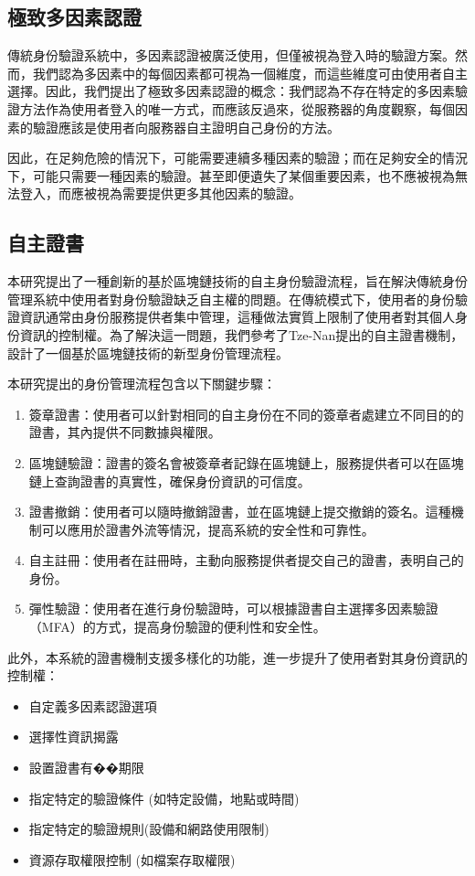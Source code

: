 \subsection{極致多因素認證}
傳統身份驗證系統中，多因素認證被廣泛使用，但僅被視為登入時的驗證方案。然而，我們認為多因素中的每個因素都可視為一個維度，而這些維度可由使用者自主選擇。因此，我們提出了極致多因素認證的概念：我們認為不存在特定的多因素驗證方法作為使用者登入的唯一方式，而應該反過來，從服務器的角度觀察，每個因素的驗證應該是使用者向服務器自主證明自己身份的方法。

因此，在足夠危險的情況下，可能需要連續多種因素的驗證；而在足夠安全的情況下，可能只需要一種因素的驗證。甚至即便遺失了某個重要因素，也不應被視為無法登入，而應被視為需要提供更多其他因素的驗證。
\subsection{自主證書}
本研究提出了一種創新的基於區塊鏈技術的自主身份驗證流程，旨在解決傳統身份管理系統中使用者對身份驗證缺乏自主權的問題。在傳統模式下，使用者的身份驗證資訊通常由身份服務提供者集中管理，這種做法實質上限制了使用者對其個人身份資訊的控制權。為了解決這一問題，我們參考了Tze-Nan\cite{NTU202102846}提出的自主證書機制，設計了一個基於區塊鏈技術的新型身份管理流程。

本研究提出的身份管理流程包含以下關鍵步驟：
\begin{enumerate}
  \item 簽章證書：使用者可以針對相同的自主身份在不同的簽章者處建立不同目的的證書，其內提供不同數據與權限。
  \item 區塊鏈驗證：證書的簽名會被簽章者記錄在區塊鏈上，服務提供者可以在區塊鏈上查詢證書的真實性，確保身份資訊的可信度。
  \item 證書撤銷：使用者可以隨時撤銷證書，並在區塊鏈上提交撤銷的簽名。這種機制可以應用於證書外流等情況，提高系統的安全性和可靠性。
  \item 自主註冊：使用者在註冊時，主動向服務提供者提交自己的證書，表明自己的身份。
  \item 彈性驗證：使用者在進行身份驗證時，可以根據證書自主選擇多因素驗證（MFA）的方式，提高身份驗證的便利性和安全性。
\end{enumerate}
此外，本系統的證書機制支援多樣化的功能，進一步提升了使用者對其身份資訊的控制權：
\begin{itemize}
  \item 自定義多因素認證選項
  \item 選擇性資訊揭露
  \item 設置證書有��期限
  \item 指定特定的驗證條件 (如特定設備，地點或時間)
  \item 指定特定的驗證規則(設備和網路使用限制)
  \item 資源存取權限控制 (如檔案存取權限)
\end{itemize}

